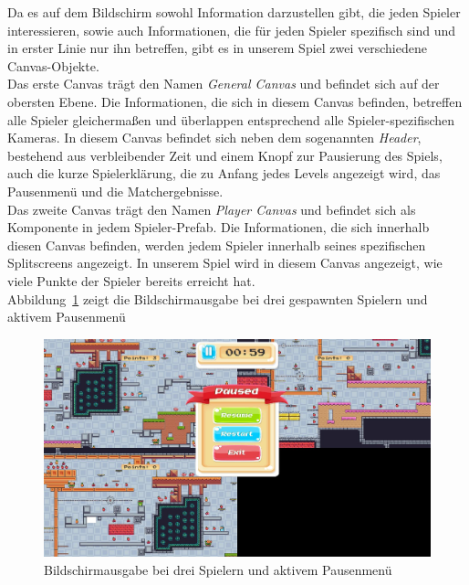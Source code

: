 Da es auf dem Bildschirm sowohl Information darzustellen gibt, die jeden Spieler interessieren, sowie auch Informationen, die für jeden Spieler spezifisch sind und in erster Linie nur ihn betreffen, gibt es in unserem Spiel zwei verschiedene Canvas-Objekte.\\

Das erste Canvas trägt den Namen \textit{General Canvas} und befindet sich auf der obersten Ebene. Die Informationen, die sich in diesem Canvas befinden, betreffen alle Spieler gleichermaßen und überlappen entsprechend alle Spieler-spezifischen Kameras. In diesem Canvas befindet sich neben dem sogenannten \textit{Header}, bestehend aus verbleibender Zeit und einem Knopf zur Pausierung des Spiels, auch die kurze Spielerklärung, die zu Anfang jedes Levels angezeigt wird, das Pausenmenü und die Matchergebnisse.\\

Das zweite Canvas trägt den Namen \textit{Player Canvas} und befindet sich als Komponente in jedem Spieler-Prefab. Die Informationen, die sich innerhalb diesen Canvas befinden, werden jedem Spieler innerhalb seines spezifischen Splitscreens angezeigt. In unserem Spiel wird in diesem Canvas angezeigt, wie viele Punkte der Spieler bereits erreicht hat.\\

Abbildung~\ref{fig:canvas} zeigt die Bildschirmausgabe bei drei gespawnten Spielern und aktivem Pausenmenü\\

\begin{figure}[th]
\centering
\includegraphics[width=155mm]{Figures/canvas.jpg}
\decoRule
\caption[Bildschirmausgabe bei drei Spielern und aktivem Pausenmenü]{Bildschirmausgabe bei drei Spielern und aktivem Pausenmenü}
\label{fig:canvas}
\end{figure}

